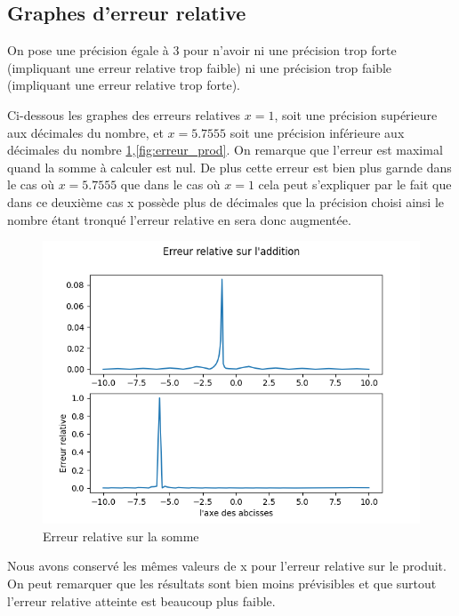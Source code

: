 \documentclass{article}
\begin{document}
\subsection*{Graphes d'erreur relative}

On pose une précision égale à 3 pour n'avoir ni une précision trop forte (impliquant une erreur relative trop faible) ni une précision trop faible (impliquant une erreur relative trop forte).

Ci-dessous les graphes des erreurs relatives ${x = 1}$, soit une précision supérieure aux décimales du nombre, et ${x = 5.7555}$ soit une précision inférieure aux décimales du nombre \ref{fig:erreur_add},\ref{fig:erreur_prod}. On remarque que l'erreur est maximal quand la somme à calculer est nul. De plus cette erreur est bien plus garnde dans le cas où ${x=5.7555}$ que dans le cas où ${x=1}$ cela peut s'expliquer par le fait que dans ce deuxième cas x possède plus de décimales que la précision choisi ainsi le nombre étant tronqué l'erreur relative en sera donc augmentée. 


\begin{figure}[ht]
    \centering
    \includegraphics[scale=0.6]{erreur_add.png}
    \caption{Erreur relative sur la somme}
    \label{fig:erreur_add}
\end{figure}

Nous avons conservé les mêmes valeurs de x pour l'erreur relative sur le produit. On peut remarquer que les résultats sont bien moins prévisibles et que surtout l'erreur relative atteinte est beaucoup plus faible. 
\end{document}
